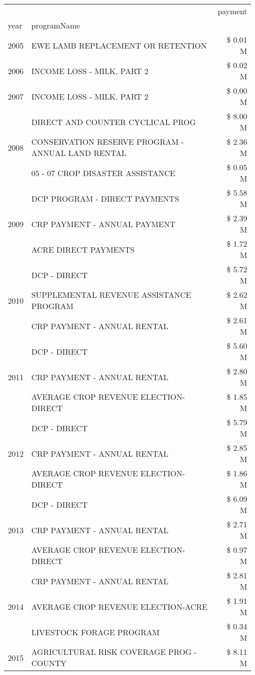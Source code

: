\begin{tabular}{llr}
\toprule
 &  & payment \\
year & programName &  \\
\midrule
2005 & EWE LAMB REPLACEMENT OR RETENTION & \$ 0.01 M \\
\cline{1-3}
2006 & INCOME LOSS - MILK, PART 2 & \$ 0.02 M \\
\cline{1-3}
2007 & INCOME LOSS - MILK, PART 2 & \$ 0.00 M \\
\cline{1-3}
\multirow[t]{3}{*}{2008} & DIRECT AND COUNTER CYCLICAL PROG & \$ 8.00 M \\
 & CONSERVATION RESERVE PROGRAM - ANNUAL LAND RENTAL & \$ 2.36 M \\
 & 05 - 07 CROP DISASTER ASSISTANCE & \$ 0.05 M \\
\cline{1-3}
\multirow[t]{3}{*}{2009} & DCP PROGRAM - DIRECT PAYMENTS & \$ 5.58 M \\
 & CRP PAYMENT - ANNUAL PAYMENT & \$ 2.39 M \\
 & ACRE DIRECT PAYMENTS & \$ 1.72 M \\
\cline{1-3}
\multirow[t]{3}{*}{2010} & DCP - DIRECT & \$ 5.72 M \\
 & SUPPLEMENTAL REVENUE ASSISTANCE PROGRAM & \$ 2.62 M \\
 & CRP PAYMENT - ANNUAL RENTAL & \$ 2.61 M \\
\cline{1-3}
\multirow[t]{3}{*}{2011} & DCP - DIRECT & \$ 5.60 M \\
 & CRP PAYMENT - ANNUAL RENTAL & \$ 2.80 M \\
 & AVERAGE CROP REVENUE ELECTION-DIRECT & \$ 1.85 M \\
\cline{1-3}
\multirow[t]{3}{*}{2012} & DCP - DIRECT & \$ 5.79 M \\
 & CRP PAYMENT - ANNUAL RENTAL & \$ 2.85 M \\
 & AVERAGE CROP REVENUE ELECTION-DIRECT & \$ 1.86 M \\
\cline{1-3}
\multirow[t]{3}{*}{2013} & DCP - DIRECT & \$ 6.09 M \\
 & CRP PAYMENT - ANNUAL RENTAL & \$ 2.71 M \\
 & AVERAGE CROP REVENUE ELECTION-DIRECT & \$ 0.97 M \\
\cline{1-3}
\multirow[t]{3}{*}{2014} & CRP PAYMENT - ANNUAL RENTAL & \$ 2.81 M \\
 & AVERAGE CROP REVENUE ELECTION-ACRE & \$ 1.91 M \\
 & LIVESTOCK FORAGE PROGRAM & \$ 0.34 M \\
\cline{1-3}
\multirow[t]{3}{*}{2015} & AGRICULTURAL RISK COVERAGE PROG - COUNTY & \$ 8.11 M \\

\end{tabular}
